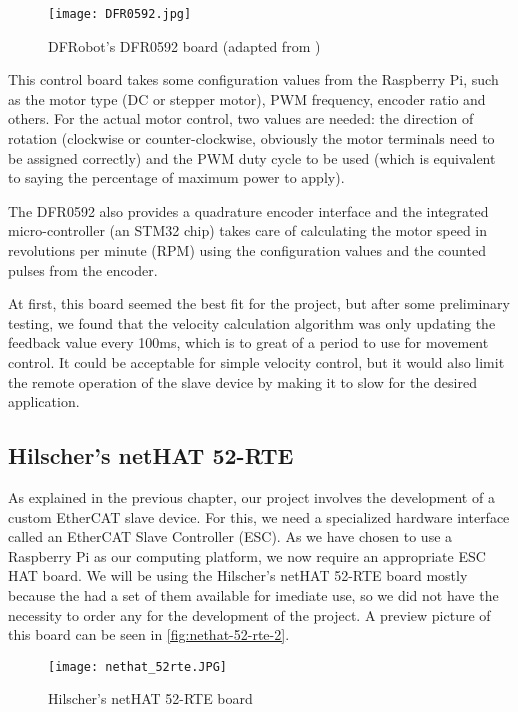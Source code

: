 \begin{figure}[htp]
	\centering
	\texttt{[image: DFR0592.jpg]}
	\caption{DFRobot's DFR0592 board (adapted from \cite{hdw:dfr0592})}
	\label{fig:dfr0592-2}
\end{figure}

This control board takes some configuration values from the Raspberry Pi, such as the motor type (DC or stepper motor), PWM frequency, encoder ratio and others.
For the actual motor control, two values are needed: the direction of rotation (clockwise or counter-clockwise, obviously the motor terminals need to be assigned correctly) and the PWM duty cycle to be used (which is equivalent to saying the percentage of maximum power to apply).

The DFR0592 also provides a quadrature encoder interface and the integrated micro-controller (an STM32 chip) takes care of calculating the motor speed in revolutions per minute (RPM) using the configuration values and the counted pulses from the encoder.

At first, this board seemed the best fit for the project, but after some preliminary testing, we found that the velocity calculation algorithm was only updating the feedback value every 100ms, which is to great of a period to use for movement control.
It could be acceptable for simple velocity control, but it would also limit the remote operation of the slave device by making it to slow for the desired application.

\subsection{Hilscher's netHAT 52-RTE}
As explained in the previous chapter, our project involves the development of a custom EtherCAT slave device.
For this, we need a specialized hardware interface called an EtherCAT Slave Controller (ESC).
As we have chosen to use a Raspberry Pi as our computing platform, we now require an appropriate ESC HAT board.
We will be using the Hilscher's netHAT 52-RTE \cite{hdw:nethat-52rte} board mostly because the \Feup{} had a set of them available for imediate use, so we did not have the necessity to order any for the development of the project.
A preview picture of this board can be seen in \autoref{fig:nethat-52-rte-2}.

\begin{figure}[htp]
	\centering
	\texttt{[image: nethat\_52rte.JPG]}
	\caption{Hilscher's netHAT 52-RTE board}
	\label{fig:nethat-52-rte-2}
\end{figure}


